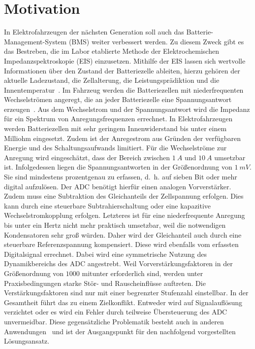 \section{Motivation}	

In Elektrofahrzeugen der nächsten Generation soll auch das Batterie-Management-System (BMS) weiter verbessert werden. Zu diesem Zweck gibt es das Bestreben, die im Labor etablierte Methode der Elektrochemischen Impedanzspektroskopie (EIS) einzusetzen. Mithilfe der EIS lassen sich wertvolle Informationen über den Zustand der Batteriezelle ableiten, hierzu gehören der aktuelle Ladezustand, die Zellalterung, die Leistungsprädiktion und die Innentemperatur~\cite{Schmidt-2013, Kohs-2022}. Im Fahrzeug werden die Batteriezellen mit niederfrequenten Wechselströmen angeregt, die an jeder Batteriezelle eine Spannungsantwort erzeugen~\cite{KeilJossen-2012, Roscher-2016, Hammerschmidt-2016}. Aus dem Wechselstrom und der Spannungsantwort wird die Impedanz für ein Spektrum von Anregungsfrequenzen errechnet. In Elektrofahrzeugen werden Batteriezellen mit sehr geringem Innenwiderstand bis unter einem Milliohm eingesetzt. Zudem ist der Anregestrom aus Gründen der verfügbaren Energie und des Schaltungsaufwands limitiert. Für die Wechselströme zur Anregung wird eingeschätzt, dass der Bereich zwischen $\SI{1}{A}$ und $\SI{10}{A}$ umsetzbar ist. Infolgedessen liegen die Spannungsantworten in der Größenordnung von $\SI{1}{mV}$. Sie sind mindestens prozentgenau zu erfassen, d.~h. auf sieben Bit oder mehr digital aufzulösen. Der ADC benötigt hierfür einen analogen Vorverstärker. Zudem muss eine Subtraktion des Gleichanteils der Zellspannung erfolgen. Dies kann durch eine steuerbare Subtrahierschaltung oder eine kapazitive Wechselstromkopplung erfolgen. Letzteres ist für eine niederfrequente Anregung bis unter ein Hertz nicht mehr praktisch umsetzbar, weil die notwendigen Kondensatoren sehr groß würden. Daher wird der Gleichanteil auch durch eine steuerbare Referenzspannung kompensiert. Diese wird ebenfalls vom erfassten Digitalsignal errechnet. Dabei wird eine symmetrische Nutzung des Dynamikbereichs des ADC angestrebt. Weil Vorverstärkungsfaktoren in der Größenordnung von $1000$ mitunter erforderlich sind, werden unter Praxisbedingungen starke Stör- und Rauscheinflüsse auftreten. Die Verstärkungsfaktoren sind nur mit einer begrenzter Stufenzahl einstellbar. In der Gesamtheit führt das zu einem Zielkonflikt. Entweder wird auf Signalauflösung verzichtet oder es wird ein Fehler durch teilweise Übersteuerung des ADC unvermeidbar. Diese gegensätzliche Problematik besteht auch in anderen Anwendungen~\cite{Abel-1991,Ting-2013, Zhou-2019, Chan-2012} und ist der Ausgangspunkt für den nachfolgend vorgestellten Lösungsansatz.

